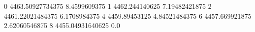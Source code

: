 0 4463.50927734375 8.4599609375
1 4462.244140625 7.19482421875
2 4461.22021484375 6.1708984375
4 4459.89453125 4.84521484375
6 4457.669921875 2.62060546875
8 4455.04931640625 0.0
